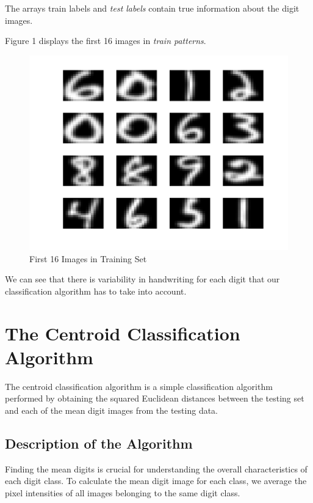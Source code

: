 \documentclass{article}
\begin{document}
The arrays {train labels} and \textit{test labels} contain true information about the digit images.

Figure 1 displays the first 16 images in \textit{train patterns}.
\begin{figure}[H]
\centering
\includegraphics[scale=0.5]{first_16_images.png}
\caption[\abovecaptionskip=18pt]{First 16 Images in Training Set}
\label{FIG:FIG 01}
\end{figure}

We can see that there is variability in handwriting for each digit that our classification algorithm has to take into account. 

\section{The Centroid Classification Algorithm}

The centroid classification algorithm is a simple classification algorithm performed by obtaining the squared Euclidean distances between the testing set and each of the mean digit images from the testing data. 

\subsection{Description of the Algorithm}

Finding the mean digits is crucial for understanding the overall characteristics of each digit class. To calculate the mean digit image for each class, we average the pixel intensities of all images belonging to the same digit class. 
\end{document}
